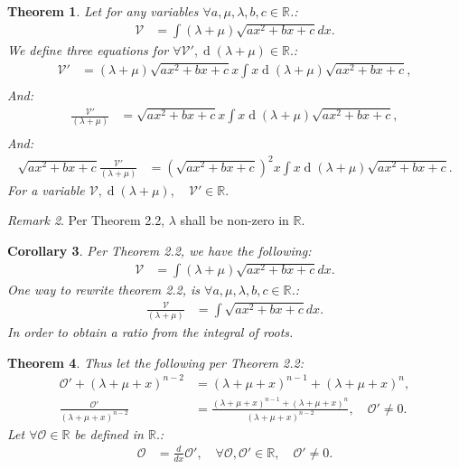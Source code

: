 \documentclass[10pt]{article}
\theoremstyle{plain}
\newtheorem{theorem}{Theorem}[section]
\newtheorem{corollary}[theorem]{Corollary}
\theoremstyle{definition}
\theoremstyle{remark}
\newtheorem{remark}[theorem]{Remark}
\begin{document}
\begin{theorem}
	Let for any variables $\forall a, \mu, \lambda, b, c \in \mathbb{R}$.:
	\begin{align*}
		\mathcal{V} &= \int (\lambda + \mu)\sqrt{ax^2 + bx  +c} dx.
	\end{align*}
	We define three equations for $\forall \mathcal{V}', \operatorname{d}(\lambda + \mu) \in \mathbb{R}.$:
	\begin{align*}
		\mathcal{V}' &= (\lambda + \mu)\sqrt{ax^2 + bx  +c}x \int x \operatorname{d}(\lambda + \mu)\sqrt{ax^2 + bx  +c},\\
	\end{align*}
	And:
	\begin{align*}
		\frac{\mathcal{V}'}{(\lambda + \mu)} &= \sqrt{ax^2 + bx  +c}x \int x \operatorname{d}(\lambda + \mu)\sqrt{ax^2 + bx  +c},\\
	\end{align*}
	And:
	\begin{align*}
		\sqrt{ax^2 + bx  +c}\frac{\mathcal{V}'}{(\lambda + \mu)} &= (\sqrt{ax^2 + bx  +c})^{2}x \int x \operatorname{d}(\lambda + \mu)\sqrt{ax^2 + bx  +c}.
	\end{align*}
	For a variable $\mathcal{V}, \operatorname{d}(\lambda + \mu), \quad \mathcal{V}' \in \mathbb{R}.$
\end{theorem}

\begin{remark}
	Per Theorem 2.2, $\lambda$ shall be non-zero in $\mathbb{R}.$
\end{remark}

\begin{corollary}
	Per Theorem 2.2, we have the following:
	\begin{align*}
		\mathcal{V} &= \int (\lambda + \mu)\sqrt{ax^2 + bx + c} dx.
	\end{align*}
	One way to rewrite theorem 2.2, is $\forall a, \mu, \lambda, b, c \in \mathbb{R}$.:
	\begin{align*}
		\frac{\mathcal{V}}{(\lambda + \mu)} &= \int \sqrt{ax^2 + bx + c} dx.
	\end{align*}
	In order to obtain a ratio from the integral of roots.
\end{corollary}

\begin{theorem}
	Thus let the following per Theorem 2.2:
	\begin{align*}
		\mathcal{O}' + (\lambda + \mu + x)^{n-2} &= (\lambda + \mu + x)^{n-1} + (\lambda + \mu + x)^{n},\\
		\frac{\mathcal{O}'}{(\lambda + \mu + x)^{n-2}} &= \frac{(\lambda + \mu + x)^{n-1} + (\lambda + \mu + x)^{n}}{(\lambda + \mu + x)^{n-2}}, \quad \mathcal{O}' \neq 0.
	\end{align*}
	Let $\forall \mathcal{O} \in \mathbb{R}$ be defined in $\mathbb{R}.$:
	\begin{align*}
		\mathcal{O} &= \frac{d}{dx} \mathcal{O}', \quad \forall \mathcal{O}, \mathcal{O}' \in \mathbb{R}, \quad \mathcal{O}' \neq 0.
	\end{align*}
\end{theorem}
\end{document}
